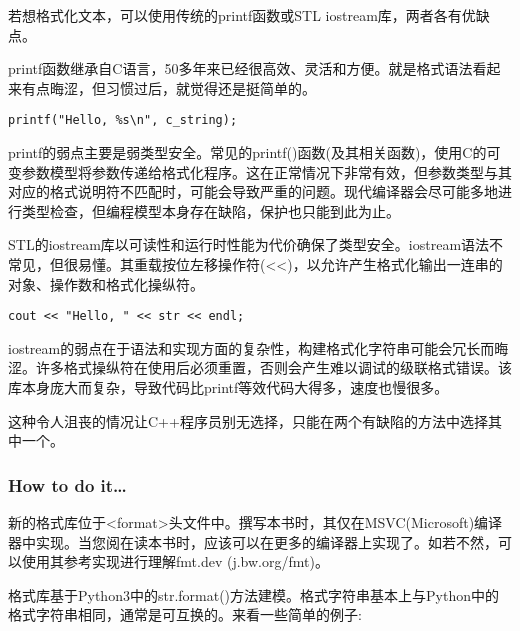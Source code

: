 
若想格式化文本，可以使用传统的printf函数或STL iostream库，两者各有优缺点。

printf函数继承自C语言，50多年来已经很高效、灵活和方便。就是格式语法看起来有点晦涩，但习惯过后，就觉得还是挺简单的。

\begin{lstlisting}[style=styleCXX]
printf("Hello, %s\n", c_string);
\end{lstlisting}

printf的弱点主要是弱类型安全。常见的printf()函数(及其相关函数)，使用C的可变参数模型将参数传递给格式化程序。这在正常情况下非常有效，但参数类型与其对应的格式说明符不匹配时，可能会导致严重的问题。现代编译器会尽可能多地进行类型检查，但编程模型本身存在缺陷，保护也只能到此为止。

STL的iostream库以可读性和运行时性能为代价确保了类型安全。iostream语法不常见，但很易懂。其重载按位左移操作符(<<)，以允许产生格式化输出一连串的对象、操作数和格式化操纵符。

\begin{lstlisting}[style=styleCXX]
cout << "Hello, " << str << endl;
\end{lstlisting}

iostream的弱点在于语法和实现方面的复杂性，构建格式化字符串可能会冗长而晦涩。许多格式操纵符在使用后必须重置，否则会产生难以调试的级联格式错误。该库本身庞大而复杂，导致代码比printf等效代码大得多，速度也慢很多。

这种令人沮丧的情况让C++程序员别无选择，只能在两个有缺陷的方法中选择其中一个。

\subsubsection{How to do it…}

新的格式库位于<format>头文件中。撰写本书时，其仅在MSVC(Microsoft)编译器中实现。当您阅在读本书时，应该可以在更多的编译器上实现了。如若不然，可以使用其参考实现进行理解fmt.dev (j.bw.org/fmt)。

格式库基于Python3中的str.format()方法建模。格式字符串基本上与Python中的格式字符串相同，通常是可互换的。来看一些简单的例子:


